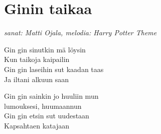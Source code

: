 \section{Ginin taikaa}

\textit{sanat: Matti Ojala, melodia: Harry Potter Theme}

Gin gin sinutkin mä löysin\\
Kun taikoja kaipailin\\
Gin gin laseihin sut kaadan taas\\
Ja iltani alkuun saan

Gin gin sainkin jo huuliin mun\\
lumouksesi, huumaannun\\
Gin gin etsin sut uudestaan\\
Kapsahtaen katajaan